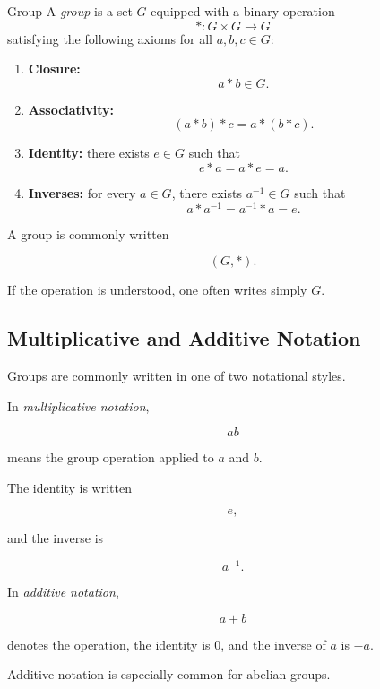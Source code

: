 \begin{definitionbox}{Group}
A \emph{group} is a set \(G\) equipped with a binary operation
\[ *:G\times G\to G \]
satisfying the following axioms for all \(a,b,c\in G\):

\begin{enumerate}
    \item \textbf{Closure:}
    \[ a*b\in G. \]

    \item \textbf{Associativity:}
    \[ (a*b)*c=a*(b*c). \]

    \item \textbf{Identity:}
    there exists \(e\in G\) such that
    \[ e*a=a*e=a. \]

    \item \textbf{Inverses:}
    for every \(a\in G\), there exists \(a^{-1}\in G\) such that
    \[ a*a^{-1}=a^{-1}*a=e. \]
\end{enumerate}
\end{definitionbox}

A group is commonly written

\[ (G,*). \]

If the operation is understood, one often writes simply \(G\).

\subsection{Multiplicative and Additive Notation}
\label{subsec:additive-multiplicative-group-notation}

Groups are commonly written in one of two notational styles.

In \emph{multiplicative notation},

\[ ab \]

means the group operation applied to \(a\) and \(b\).

The identity is written

\[ e, \]

and the inverse is

\[ a^{-1}. \]

In \emph{additive notation},

\[ a+b \]

denotes the operation, the identity is \(0\), and the inverse of \(a\) is
\(-a\).

Additive notation is especially common for abelian groups.

